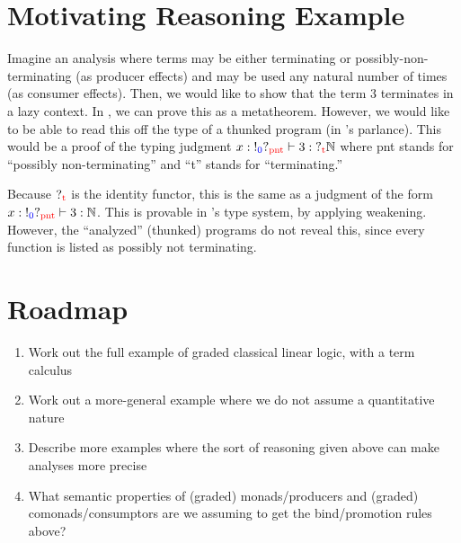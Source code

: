 \documentclass{article}
\newcommand{\proves}{\vdash}
\newcommand{\consgrade}[1]{\textcolor{blue}{#1}}
\newcommand{\prodgrade}[1]{\textcolor{red}{#1}}
\newcommand{\bangg}[1]{\mathord{!_{\consgrade{#1}}}}
\newcommand{\queryg}[1]{\mathord{?_{\prodgrade{#1}}}}
\begin{document}
\section{Motivating Reasoning Example}

Imagine an analysis where terms may be either terminating or possibly-non-terminating (as producer effects) and may be used any natural number of times (as consumer effects).
Then, we would like to show that the term $3$ terminates in a lazy context.
In \citet{Hirsch}, we can prove this as a metatheorem.
However, we would like to be able to read this off the type of a thunked program (in \citet{Hirsch}'s parlance).
This would be a proof of the typing judgment $x : \bangg{0}\queryg{\mathrm{pnt}} \proves 3 : \queryg{\mathrm{t}} \mathbb{N}$ where pnt stands for ``possibly non-terminating'' and ``t'' stands for ``terminating.''

Because $\queryg{\mathrm{t}}$ is the identity functor, this is the same as a judgment of the form $x : \bangg{0}\queryg{\mathrm{pnt}} \proves 3 : \mathbb{N}$.
This is provable in \citet{Hirsch}'s type system, by applying weakening.
However, the ``analyzed'' (thunked) programs do not reveal this, since every function is listed as possibly not terminating.

\section {Roadmap}

\begin{enumerate}
\item Work out the full example of graded classical linear logic, with a term calculus
\item Work out a more-general example where we do not assume a quantitative nature
\item Describe more examples where the sort of reasoning given above can make analyses more precise
\item What semantic properties of (graded) monads/producers and (graded) comonads/consumptors are we assuming to get the bind/promotion rules above?
\end{enumerate}



\end{document}
